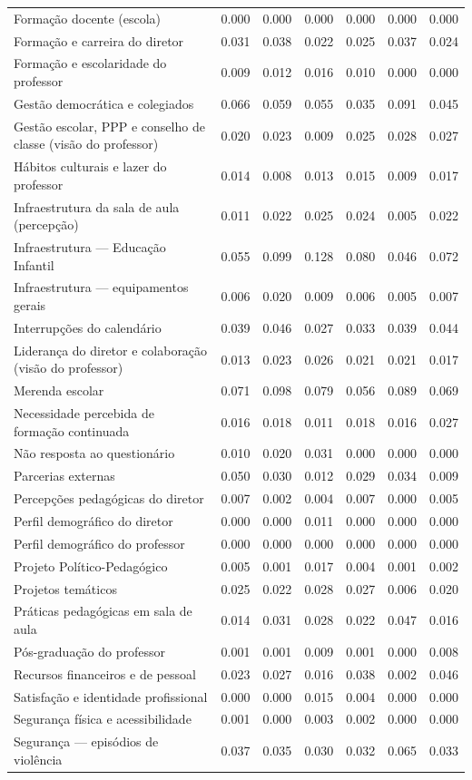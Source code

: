 \begin{tabular}{lrrrrrr}
Formação docente (escola) & 0.000 & 0.000 & 0.000 & 0.000 & 0.000 & 0.000 \\
Formação e carreira do diretor & 0.031 & 0.038 & 0.022 & 0.025 & 0.037 & 0.024 \\
Formação e escolaridade do professor & 0.009 & 0.012 & 0.016 & 0.010 & 0.000 & 0.000 \\
Gestão democrática e colegiados & 0.066 & 0.059 & 0.055 & 0.035 & 0.091 & 0.045 \\
Gestão escolar, PPP e conselho de classe (visão do professor) & 0.020 & 0.023 & 0.009 & 0.025 & 0.028 & 0.027 \\
Hábitos culturais e lazer do professor & 0.014 & 0.008 & 0.013 & 0.015 & 0.009 & 0.017 \\
Infraestrutura da sala de aula (percepção) & 0.011 & 0.022 & 0.025 & 0.024 & 0.005 & 0.022 \\
Infraestrutura — Educação Infantil & 0.055 & 0.099 & 0.128 & 0.080 & 0.046 & 0.072 \\
Infraestrutura — equipamentos gerais & 0.006 & 0.020 & 0.009 & 0.006 & 0.005 & 0.007 \\
Interrupções do calendário & 0.039 & 0.046 & 0.027 & 0.033 & 0.039 & 0.044 \\
Liderança do diretor e colaboração (visão do professor) & 0.013 & 0.023 & 0.026 & 0.021 & 0.021 & 0.017 \\
Merenda escolar & 0.071 & 0.098 & 0.079 & 0.056 & 0.089 & 0.069 \\
Necessidade percebida de formação continuada & 0.016 & 0.018 & 0.011 & 0.018 & 0.016 & 0.027 \\
Não resposta ao questionário & 0.010 & 0.020 & 0.031 & 0.000 & 0.000 & 0.000 \\
Parcerias externas & 0.050 & 0.030 & 0.012 & 0.029 & 0.034 & 0.009 \\
Percepções pedagógicas do diretor & 0.007 & 0.002 & 0.004 & 0.007 & 0.000 & 0.005 \\
Perfil demográfico do diretor & 0.000 & 0.000 & 0.011 & 0.000 & 0.000 & 0.000 \\
Perfil demográfico do professor & 0.000 & 0.000 & 0.000 & 0.000 & 0.000 & 0.000 \\
Projeto Político-Pedagógico & 0.005 & 0.001 & 0.017 & 0.004 & 0.001 & 0.002 \\
Projetos temáticos & 0.025 & 0.022 & 0.028 & 0.027 & 0.006 & 0.020 \\
Práticas pedagógicas em sala de aula & 0.014 & 0.031 & 0.028 & 0.022 & 0.047 & 0.016 \\
Pós-graduação do professor & 0.001 & 0.001 & 0.009 & 0.001 & 0.000 & 0.008 \\
Recursos financeiros e de pessoal & 0.023 & 0.027 & 0.016 & 0.038 & 0.002 & 0.046 \\
Satisfação e identidade profissional & 0.000 & 0.000 & 0.015 & 0.004 & 0.000 & 0.000 \\
Segurança física e acessibilidade & 0.001 & 0.000 & 0.003 & 0.002 & 0.000 & 0.000 \\
Segurança — episódios de violência & 0.037 & 0.035 & 0.030 & 0.032 & 0.065 & 0.033 \\
\bottomrule
\end{tabular}
